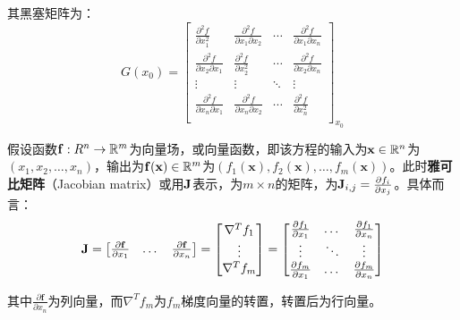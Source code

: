 \documentclass[11pt]{article}
\begin{document}
\begin{appendices}
其黑塞矩阵为：
\begin{equation*}
    G(x_0) =
    \begin{bmatrix}
        \frac{\partial^2 f}{\partial x_1^2} & \frac{\partial^2 f}{\partial x_1 \partial x_2} & \cdots & \frac{\partial^2 f}{\partial x_1 \partial x_n} \\
        \frac{\partial^2 f}{\partial x_2 \partial x_1} & \frac{\partial^2 f}{\partial x_2^2} & \cdots & \frac{\partial^2 f}{\partial x_2 \partial x_n} \\
        \vdots & \vdots & \ddots & \vdots \\
        \frac{\partial^2 f}{\partial x_n \partial x_1} & \frac{\partial^2 f}{\partial x_n \partial x_2} & \cdots & \frac{\partial^2 f}{\partial x_n^2} \\
    \end{bmatrix}_{x_0}
\end{equation*}

假设函数$\mathbf{f}:R^n \rightarrow \mathbb{R}^m$为向量场，或向量函数，即该方程的输入为$\mathbf{x} \in \mathbb{R}^n$为$(x_1,x_2,\dots,x_n)$，输出为$\mathbf{f}(\mathbf{x}) \in \mathbb{R}^m$为$(f_1(\mathbf{x}),f_2(\mathbf{x}),\dots,f_m(\mathbf{x}))$。此时\textbf{雅可比矩阵}（Jacobian matrix）或用$\mathbf{J}$表示，为$m \times n$的矩阵，为$\mathbf{J}_{i,j} = \frac{\partial f_i}{\partial x_j}$。具体而言：
\begin{equation*}
    \mathbf{J} =
    \begin{bmatrix}
        \frac{\partial \mathbf{f}}{\partial x_1} & \dots & \frac{\partial \mathbf{f}}{\partial x_n} \\
    \end{bmatrix}
    = \begin{bmatrix}
        \nabla^{T} f_1 \\
        \vdots \\
        \nabla^{T} f_m \\
    \end{bmatrix}
    = \begin{bmatrix}
        \frac{\partial f_1}{\partial x_1} & \dots & \frac{\partial f_1}{\partial x_n} \\
        \vdots & \ddots & \vdots \\
        \frac{\partial f_m}{\partial x_1} & \dots & \frac{\partial f_m}{\partial x_n} \\
    \end{bmatrix}
\end{equation*}

其中$\frac{\partial \mathbf{f}}{\partial x_n}$为列向量，而$\nabla^T f_m$为$f_m$梯度向量的转置，转置后为行向量。


\end{appendices}
\end{document}
